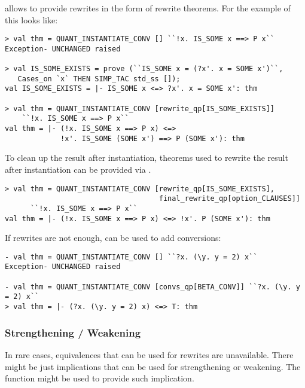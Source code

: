  allows to provide rewrites in the form of rewrite theorems.
For the example of  this looks like:

\begin{session}
\begin{verbatim}
> val thm = QUANT_INSTANTIATE_CONV [] ``!x. IS_SOME x ==> P x`` 
Exception- UNCHANGED raised

> val IS_SOME_EXISTS = prove (``IS_SOME x = (?x'. x = SOME x')``, 
   Cases_on `x` THEN SIMP_TAC std_ss []);
val IS_SOME_EXISTS = |- IS_SOME x <=> ?x'. x = SOME x': thm

> val thm = QUANT_INSTANTIATE_CONV [rewrite_qp[IS_SOME_EXISTS]] 
    ``!x. IS_SOME x ==> P x`` 
val thm = |- (!x. IS_SOME x ==> P x) <=> 
             !x'. IS_SOME (SOME x') ==> P (SOME x'): thm
\end{verbatim}
\end{session}

To clean up the result after instantiation, theorems used to rewrite the result after instantiation can be provided via
.
\begin{session}
\begin{verbatim}
> val thm = QUANT_INSTANTIATE_CONV [rewrite_qp[IS_SOME_EXISTS], 
                                    final_rewrite_qp[option_CLAUSES]] 
      ``!x. IS_SOME x ==> P x``
val thm = |- (!x. IS_SOME x ==> P x) <=> !x'. P (SOME x'): thm
\end{verbatim}
\end{session}

If rewrites are not enough,  can be used to add conversions:
\begin{session}
\begin{verbatim}
- val thm = QUANT_INSTANTIATE_CONV [] ``?x. (\y. y = 2) x`` 
Exception- UNCHANGED raised

- val thm = QUANT_INSTANTIATE_CONV [convs_qp[BETA_CONV]] ``?x. (\y. y = 2) x``
> val thm = |- (?x. (\y. y = 2) x) <=> T: thm
\end{verbatim}
\end{session}

\subsubsection{Strengthening / Weakening}

In rare cases, equivalences that can be used for rewrites are unavailable. There might be just implications that
can be used for strengthening or weakening. The function
 might be used to provide such implication.

